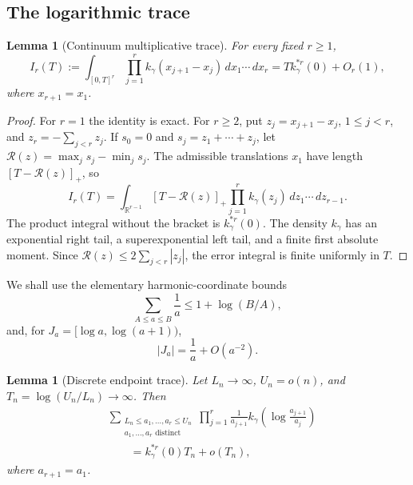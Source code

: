 \documentclass[11pt]{article}
\newtheorem{lemma}[theorem]{Lemma}
\theoremstyle{remark}
\newcommand{\dd}{\,d}
\begin{document}
\subsection{The logarithmic trace}

\begin{lemma}[Continuum multiplicative trace]
\label{lem:continuum-endpoint-trace}
For every fixed $r\ge1$,
\[
        I_r(T):=\int_{[0,T]^r}
        \prod_{j=1}^r k_\gamma(x_{j+1}-x_j)
        \dd x_1\cdots\dd x_r
        =T k_\gamma^{*r}(0)+O_r(1),
\tag{10.46}\label{eq:continuum-endpoint-trace}
\]
where $x_{r+1}=x_1$.
\end{lemma}

\begin{proof}
For $r=1$ the identity is exact.  For $r\ge2$, put
$z_j=x_{j+1}-x_j$, $1\le j<r$, and
$z_r=-\sum_{j<r}z_j$.  If $s_0=0$ and
$s_j=z_1+\cdots+z_j$, let
$\mathcal R(z)=\max_js_j-\min_js_j$.  The admissible translations $x_1$ have
length $[T-\mathcal R(z)]_+$, so
\[
        I_r(T)=\int_{\mathbb R^{r-1}}[T-\mathcal R(z)]_+
        \prod_{j=1}^r k_\gamma(z_j)\dd z_1\cdots\dd z_{r-1}.
\]
The product integral without the bracket is $k_\gamma^{*r}(0)$.  The density
$k_\gamma$ has an exponential right tail, a superexponential left tail, and a
finite first absolute moment.  Since
$\mathcal R(z)\le2\sum_{j<r}|z_j|$, the error integral is finite uniformly in
$T$.
\end{proof}

We shall use the elementary harmonic-coordinate bounds
\[
        \sum_{A\le a\le B}\frac1a
        \le1+\log(B/A),
\tag{10.47}\label{eq:harmonic-interval-bound}
\]
and, for $J_a=[\log a,\log(a+1))$,
\[
        |J_a|=\frac1a+O(a^{-2}).
\tag{10.48}\label{eq:log-cell-length}
\]

\begin{lemma}[Discrete endpoint trace]
\label{lem:discrete-endpoint-trace}
Let $L_n\to\infty$, $U_n=o(n)$, and
$T_n=\log(U_n/L_n)\to\infty$.  Then
\[
\begin{aligned}
&\sum_{\substack{L_n\le a_1,\ldots,a_r\le U_n\\
        a_1,\ldots,a_r\text{ distinct}}}
        \prod_{j=1}^r\frac1{a_{j+1}}
        k_\gamma\!\left(\log\frac{a_{j+1}}{a_j}\right)\\
&\qquad=k_\gamma^{*r}(0)T_n+o(T_n),
\end{aligned}
\tag{10.49}\label{eq:discrete-endpoint-trace}
\]
where $a_{r+1}=a_1$.
\end{lemma}
\end{document}
